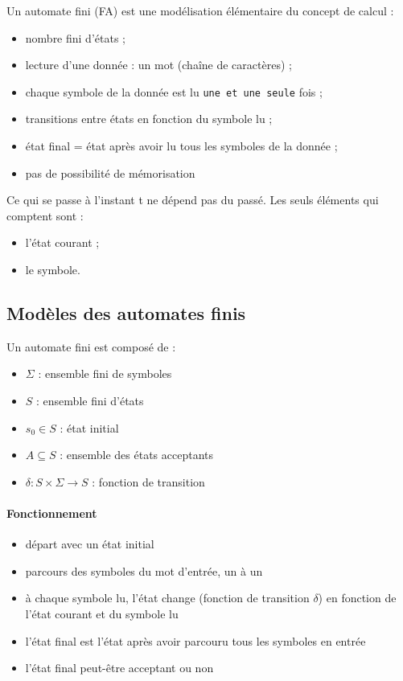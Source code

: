 Un automate fini (FA) est une modélisation élémentaire du concept de calcul :
\begin{itemize}
\item nombre fini d'états ;
\item lecture d'une donnée : un mot (chaîne de caractères) ;
\item chaque symbole de la donnée est lu \texttt{une et une seule} fois ;
\item transitions entre états en fonction du symbole lu ;
\item état final = état après avoir lu tous les symboles de la donnée ;
\item pas de possibilité de mémorisation
\end{itemize}
Ce qui se passe à l'instant t ne dépend pas du passé. Les seuls éléments qui comptent sont :
\begin{itemize}
\item l'état courant ;
\item le symbole.
\end{itemize}
\subsection{Modèles des automates finis}
\label{ssub:mod_les_des_automates_finis}
Un automate fini est composé de :

\begin{itemize}
	\item $\Sigma$ : ensemble fini de symboles
	\item $S$ : ensemble fini d'états
	\item $s_0 \in S$ : état initial
	\item $A \subseteq S$ : ensemble des états acceptants
	\item $\delta: S \times \Sigma \rightarrow S$ : fonction de transition
\end{itemize}


\paragraph{Fonctionnement}
\begin{itemize}
	\item départ avec un état initial
	\item parcours des symboles du mot d'entrée, un à un
	\item à chaque symbole lu, l'état change (fonction de transition
		$\delta$) en fonction de l'état courant et du symbole lu
	\item l'état final est l'état après avoir parcouru tous les symboles en
		entrée
	\item l'état final peut-être acceptant ou non
\end{itemize}

